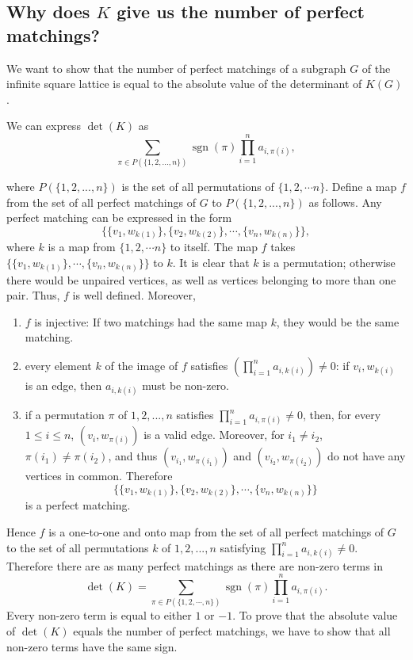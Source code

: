 \documentclass[10pt,reqno]{amsart}
\theoremstyle{plain}
\theoremstyle{definition}
\theoremstyle{remark}
\DeclareMathOperator{\sgn }{sgn }
\begin{document}
\subsection{Why does $K$ give us the number of perfect matchings?}

We want to show that the number of perfect matchings of a subgraph $G$ of the
infinite square lattice is equal to the absolute value of the
determinant of $K(G)$. 

We can express $\det(K) $ as
\begin{equation}
\sum_{\pi \in P(\{1,2,...,n\})} \sgn(\pi) \prod_{i=1}^n a_{i,\pi(i)},
\end{equation}

where $P(\{1,2,...,n\})$ is the set of all permutations of $\{1,2,\dotsb n\}$.
Define a map $f$ from the set of all perfect matchings of $G$ to 
$P(\{1,2,...,n\})$ as follows. Any perfect matching can
be expressed in the form
\begin{equation}
\{\{v_1,w_{k(1)}\},\{v_2,w_{k(2)}\},\dotsb ,\{v_n,w_{k(n)}\}\}, 
\end{equation}
where $k$ is a map from $\{ 1,2,\dotsb n\} $ to itself.
The map $f$ takes 
$\{\{v_1,w_{k(1)}\},\dotsb ,\{v_n,w_{k(n)}\}\}$ to $k$. It
is clear that $k$ is a permutation; otherwise there would be unpaired
vertices, as well as vertices belonging to more than one pair. Thus, 
$f$ is well defined. Moreover,
\begin{enumerate}
\item $f$ is injective: If two matchings had the same map $k$, they would be
the same matching.
\item every element $k$ of the image of $f$ satisfies 
$(\prod_{i=1}^n a_{i,k(i)})\ne 0$:
if ${v_i,w_{k(i)}}$ is an edge, then $a_{i,k(i)}$ must be non-zero.
\item if a permutation $\pi $ of ${1,2,...,n}$ satisfies 
$\prod_{i=1}^n a_{i,\pi(i)}\ne 0$,
then, for every $1\le i\le n$, $(v_i,w_{\pi(i)})$ is a valid edge. Moreover,
for $i_1\ne i_2$, $\pi(i_1) \ne \pi(i_2)$, and thus $(v_{i_1},w_{\pi(i_1)})$
 and
$(v_{i_2},w_{\pi(i_2)})$ do not have any vertices in common. Therefore
\begin{equation}\{\{v_1,w_{k(1)}\},\{v_2,w_{k(2)}\},\dotsb ,\{v_n,w_{k(n)}\}\}\end{equation}
is a perfect matching.
\end{enumerate}

Hence $f$ is a one-to-one and onto map from the set of all perfect
matchings of $G$ to the set of all permutations $k$ 
of ${1,2,...,n}$ satisfying
$\prod_{i=1}^n a_{i,k(i)} \ne 0$. Therefore there are as many
perfect matchings as there are non-zero terms in
\begin{equation} \det(K) = 
\sum_{\pi \in P(\{1,2,\dotsb ,n\})} \sgn(\pi) \prod_{i=1}^n a_{i,\pi(i)}.\end{equation}
Every non-zero term is equal to either $1$ or $-1$. 
To prove that the absolute value of
$\det (K)$ equals the number of perfect matchings, we have
to show that all non-zero terms have the same sign. 
\end{document}
